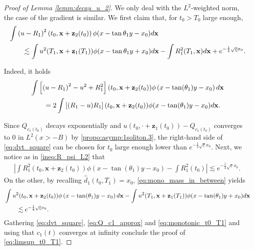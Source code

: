 \documentclass[reqno,10pt]{amsart}
\numberwithin{equation}{section}
\newcommand{\bx}{\mathbf{x}}
\newcommand{\bz}{\mathbf{z}}
\begin{document}
\begin{proof}[Proof of Lemma \ref{lemm:decay_u_2}]
We only deal with the $L^2$-weighted norm, the case of the gradient is similar. We first claim that, for $t_0>T_0$ large enough,
\begin{align}
    \MoveEqLeft
    \int \left( u - R_1 \right)^2 \left( t_0, \bx + \bz_2(t_0) \right) \phi( x- \tan \theta_1 y -x_0) d \bx \nonumber \\
    & \lesssim \int u^2(T_1, \bx + \bz_1(T_1) ) \phi( x- \tan \theta_1 y + x_0) d\bx - \int R_1^2(T_1,\bx) d \bx + e^{- \frac14 \sqrt{\underline{c}}x_0}. \label{eq:limsup_t0_T1}
\end{align}

Indeed, it holds
\begin{align}
\MoveEqLeft
	\int \left[ \left( u - R_1 \right)^2 -u^2 + R_1^2 \right](t_0, \bx + \bz_2(t_0)) \phi \left(x- \tan(\theta_1)y -x_0 \right) d\bx \nonumber \\
	& =2 \int \left[ (R_1 - u )R_1 \right](t_0, \bx + \bz_2(t_0)) \phi (x- \tan(\theta_1)y -x_0) d\bx . \label{eq:dvt_square} 
\end{align} 

Since $Q_{c_1(t_0)}$ decays exponentially and $u(t_0, \cdot + \bz_1(t_0)) - Q_{c_1(t_0)}$ converges to $0$ in $L^2(x>-B)$ by \eqref{propo:asymp:1soliton.3}, the right-hand side of \eqref{eq:dvt_square} can be chosen for $t_0$ large enough lower than $e^{- \frac14 \sqrt{\underline{c}} x_0}$.
Next, we notice as in \eqref{ineq:R_psi_L2} that
\begin{align}\label{eq:Q_c1_approx}
    \left\vert \int R_1^2(t_0,\bx + \bz_2(t_0)) \phi \left( x - \tan(\theta_1)y -x_0 \right) - \int R_1^2(t_0) \right\vert \lesssim e^{- \frac14 \sqrt{\underline{c}}x_0}.
\end{align}
On the other, by recalling $\hat{d}_1(t_0,T_1)=x_0$, \eqref{eq:mono_mass_in_between} yields
\begin{align}
    \MoveEqLeft
    \int u^2(t_0, \bx + \bz_2(t_0) ) \phi \left( x- \tan (\theta_1) y -x_0 \right) d\bx - \int u^2(T_1, \bx + \bz_1(T_1) ) \phi(x- \tan(\theta_1) y + x_0) d\bx \nonumber \\
    & \lesssim e^{- \frac14 \sqrt{\underline{c}} x_0}. \label{eq:monotonic_t0_T1}
\end{align}
Gathering \eqref{eq:dvt_square}, \eqref{eq:Q_c1_approx} and \eqref{eq:monotonic_t0_T1} and using that $c_1(t)$ converges at infinity conclude the proof of \eqref{eq:limsup_t0_T1}. 


\end{proof}
\end{document}
